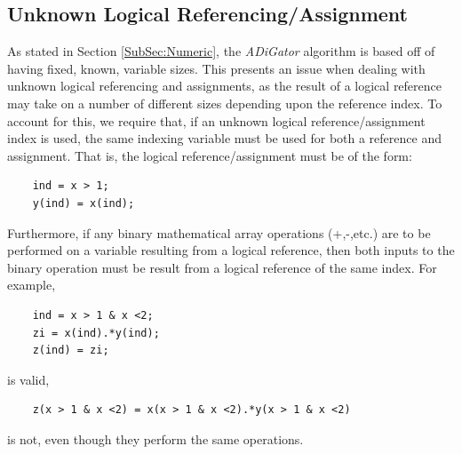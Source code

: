 \documentclass[10pt,pdftex]{article}
\begin{document}
\subsection{Unknown Logical Referencing/Assignment}\label{SubSec:Logical}
As stated in Section \ref{SubSec:Numeric}, the \emph{ADiGator} algorithm is based off of having fixed, known, variable sizes. This presents an issue when dealing with unknown logical referencing and assignments, as the result of a logical reference may take on a number of different sizes depending upon the reference index. To account for this, we require that, if an unknown logical reference/assignment index is used, the same indexing variable must be used for both a reference and assignment. That is, the logical reference/assignment must be of the form:
\begin{verbatim}
    ind = x > 1;
    y(ind) = x(ind);
\end{verbatim}
Furthermore, if any binary mathematical array operations (+,-,etc.) are to be performed on a variable resulting from a logical reference, then both inputs to the binary operation must be result from a logical reference of the same index. For example,
\begin{verbatim}
    ind = x > 1 & x <2;
    zi = x(ind).*y(ind);
    z(ind) = zi;
\end{verbatim}
is valid,
\begin{verbatim}
    z(x > 1 & x <2) = x(x > 1 & x <2).*y(x > 1 & x <2)
\end{verbatim}
is not, even though they perform the same operations.
\end{document}
